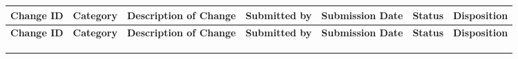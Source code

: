 \documentclass[10pt,letterpaper]{article}
\renewcommand\arraystretch{1.25}
\begin{document}
\begin{center}
\begingroup
\setlength\tabcolsep{2.0pt}
\scriptsize
\renewcommand\arraystretch{1.55}
\begin{longtable}{|>{\raggedright\arraybackslash}p{0.834in}|>{\raggedright\arraybackslash}p{0.834in}|>{\raggedright\arraybackslash}p{0.834in}|>{\raggedright\arraybackslash}p{0.834in}|>{\raggedright\arraybackslash}p{0.834in}|>{\raggedright\arraybackslash}p{0.834in}|>{\raggedright\arraybackslash}p{0.834in}|}
\hline
\rowcolor{light}
\textbf{Change ID} & \textbf{Category} & \textbf{Description of Change} & \textbf{Submitted by} & \textbf{Submission Date} & \textbf{Status} & \textbf{Disposition} \\ \hline
\endfirsthead
\hline\rowcolor{light} \textbf{Change ID} & \textbf{Category} & \textbf{Description of Change} & \textbf{Submitted by} & \textbf{Submission Date} & \textbf{Status} & \textbf{Disposition} \\ \hline
\endhead
\rule{0pt}{11pt}\hspace{0pt} & \rule{0pt}{11pt}\hspace{0pt} & \rule{0pt}{11pt}\hspace{0pt} & \rule{0pt}{11pt}\hspace{0pt} & \rule{0pt}{11pt}\hspace{0pt} & \rule{0pt}{11pt}\hspace{0pt} & \rule{0pt}{11pt}\hspace{0pt} \\ \hline
\rule{0pt}{11pt}\hspace{0pt} & \rule{0pt}{11pt}\hspace{0pt} & \rule{0pt}{11pt}\hspace{0pt} & \rule{0pt}{11pt}\hspace{0pt} & \rule{0pt}{11pt}\hspace{0pt} & \rule{0pt}{11pt}\hspace{0pt} & \rule{0pt}{11pt}\hspace{0pt} \\ \hline
\rule{0pt}{11pt}\hspace{0pt} & \rule{0pt}{11pt}\hspace{0pt} & \rule{0pt}{11pt}\hspace{0pt} & \rule{0pt}{11pt}\hspace{0pt} & \rule{0pt}{11pt}\hspace{0pt} & \rule{0pt}{11pt}\hspace{0pt} & \rule{0pt}{11pt}\hspace{0pt} \\ \hline

\end{longtable}
\end{center}
\end{document}
